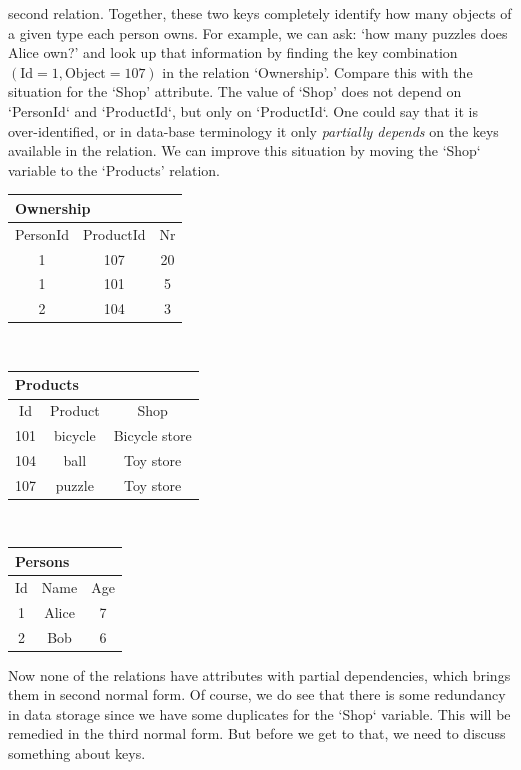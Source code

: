 second relation. Together, these two keys completely identify how many objects
of a given type each person owns. For example, we can ask: `how many puzzles
does Alice own?' and look up that information by finding the key combination
$(\textrm{Id}=1, \textrm{Object}=107)$ in the relation `Ownership'.  Compare this
with the situation for the `Shop' attribute. The value of `Shop' does not
depend on `PersonId` and `ProductId`, but only on `ProductId`. One could say that it is
over-identified, or in data-base terminology it only \emph{partially depends}
on the keys available in the relation.  We can improve this situation by moving
the `Shop` variable to the `Products' relation.
\begin{center}
\begin{tabular}{|ccc|}
\multicolumn{3}{l}{Ownership}\\
\hline
PersonId & ProductId  & Nr   \\
\hline             
1  &   107   &20     \\
1  &   101   &5     \\
2  &   104   &3     \\
\hline
\end{tabular}$\textrm{ }$\begin{tabular}{|ccc|}
\multicolumn{3}{l}{Products}\\
\hline
Id  & Product & Shop          \\ 
\hline                       
101 & bicycle& Bicycle store     \\
104 & ball   & Toy store \\
107 & puzzle & Toy store     \\
\hline
\end{tabular}$\textrm{ }$

\begin{tabular}{|ccc|}
\multicolumn{2}{l}{Persons}\\
\hline
Id  & Name & Age \\ 
\hline
1 & Alice & 7\\
2 & Bob   & 6\\
\hline
\end{tabular}
\end{center}
Now none of the relations have attributes with partial dependencies, which
brings them in second normal form. Of course, we do see that there is some
redundancy in data storage since we have some duplicates for the `Shop`
variable. This will be remedied in the third normal form. But before we get to
that, we need to discuss something about keys.

